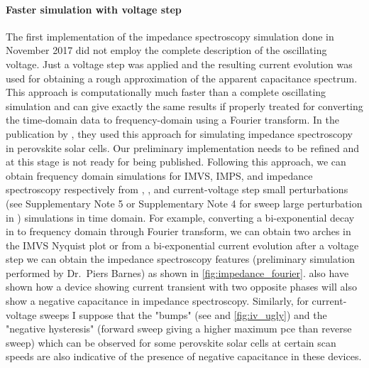 	\paragraph{Faster simulation with voltage step}\label{impedance_fourier}
	The first implementation of the impedance spectroscopy simulation done in November 2017 did not employ the complete description of the oscillating voltage.
	Just a voltage step was applied and the resulting current evolution was used for obtaining a rough approximation of the apparent capacitance spectrum.
	This approach is computationally much faster than a complete oscillating simulation and can give exactly the same results if properly treated for converting the time\hyp{}domain data to frequency\hyp{}domain using a Fourier transform.
	In the publication by , they used this approach for simulating impedance spectroscopy in perovskite solar cells.
	Our preliminary implementation needs to be refined and at this stage is not ready for being published.
	Following this approach, we can obtain frequency domain simulations for IMVS, IMPS, and impedance spectroscopy respectively from , , and current\hyp{}voltage step small perturbations (see Supplementary Note 5 or Supplementary Note 4 for sweep large perturbation in ) simulations in time domain.
	For example, converting a bi\hyp{}exponential decay in  to frequency domain through Fourier transform, we can obtain two arches in the IMVS Nyquist plot or from a bi\hyp{}exponential current evolution after a voltage step we can obtain the impedance spectroscopy features (preliminary simulation performed by Dr.\ Piers Barnes) as shown in \cref{fig:impedance_fourier}.
	 also have shown how a device showing current transient with two opposite phases will also show a negative capacitance in impedance spectroscopy.
	Similarly, for current\hyp{}voltage sweeps I suppose that the "bumps" (see  and \cref{fig:iv_ugly}) and the "negative hysteresis" (forward sweep giving a higher maximum \gls{pce} than reverse sweep) which can be observed for some perovskite solar cells at certain scan speeds are also indicative of the presence of negative capacitance in these devices.

